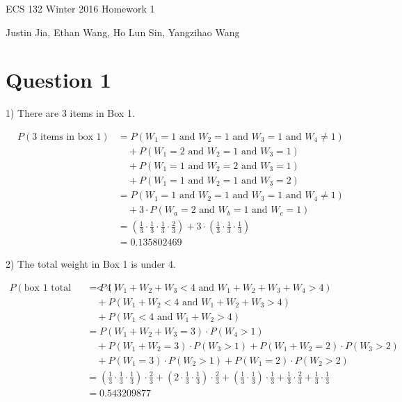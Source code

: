 \documentclass[11pt]{article}
\begin{document}
ECS 132 Winter 2016 Homework 1

Justin Jia, Ethan Wang, Ho Lun Sin, Yangzihao Wang

\section{Question 1}

1) There are 3 items in Box 1.

\begin{align*}
P(\text{3 items in box 1}) &= P(W_1 = 1 \text{ and } W_2 = 1 \text{ and } W_3 = 1 \text{ and } W_4 \neq 1)\\
                              &\quad + P(W_1 = 2 \text{ and } W_2 = 1 \text{ and } W_3 = 1)\\
                              &\quad + P(W_1 = 1 \text{ and } W_2 = 2 \text{ and } W_3 = 1)\\
                              &\quad + P(W_1 = 1 \text{ and } W_2 = 1 \text{ and } W_3 = 2)\\
                           &= P(W_1 = 1 \text{ and } W_2 = 1 \text{ and } W_3 = 1 \text{ and } W_4 \neq 1)\\
                              &\quad + 3 \cdot P(W_a = 2 \text{ and } W_b = 1 \text{ and } W_c = 1)\\
                           &= (\frac13 \cdot \frac13 \cdot \frac13 \cdot \frac23) + 3 \cdot (\frac13 \cdot \frac13 \cdot \frac13)\\
                           &= 0.135802469
\end{align*}

2) The total weight in Box 1 is under 4.

\begin{align*}
P(\text{box 1 total weight} < 4) &= P(W_1 + W_2 + W_3 < 4 \text{ and } W_1 + W_2 + W_3 + W_4 > 4)\\
                                    &\quad + P(W_1 + W_2 < 4 \text{ and } W_1 + W_2 + W_3 > 4)\\
                                    &\quad + P(W_1 < 4 \text{ and } W_1 + W_2 > 4)\\
                                 &= P(W_1 + W_2 + W_3 = 3) \cdot P(W_4 > 1)\\
                                    &\quad + P(W_1 + W_2 = 3) \cdot P(W_3 > 1) + P(W_1 + W_2 = 2) \cdot P(W_3 > 2)\\
                                    &\quad + P(W_1 = 3) \cdot P(W_2 > 1) + P(W_1 = 2) \cdot P(W_2 > 2)\\
                                 &= (\frac13 \cdot \frac13 \cdot \frac13) \cdot \frac23 + (2 \cdot \frac13 \cdot \frac13) \cdot \frac23 + (\frac13 \cdot \frac13) \cdot \frac13 + \frac13 \cdot \frac23 + \frac13 \cdot \frac13\\
                                 &= 0.543209877
\end{align*}
\end{document}
